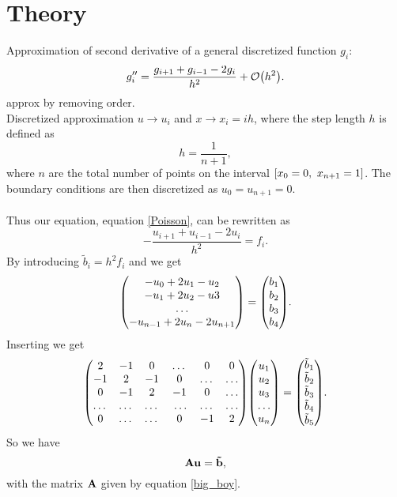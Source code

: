 \documentclass[notitlepage, reprint, nofootinbib]{revtex4-1}
\begin{document}
\section{Theory}
Approximation of second derivative of a general discretized function $g_i$: 
\begin{equation}\label{second_derivative} g_i'' = \frac{g_{i+1}+g_{i-1}-2g_i}{h^2}+\order{h^2}.\end{equation}
{\color{red}approx by removing order.} \\[2mm]
Discretized approximation $u\rightarrow u_i$ and $x\rightarrow x_i=ih$, where the step length $h$ is defined as
\begin{equation}\label{step-length}h=\frac{1}{n+1},\end{equation} 
where $n$ are the total number of points on the interval $\qty[x_0=0,\ x_{n+1}=1]$. The boundary conditions are then discretized as $u_0=u_{n+1}=0$.\\[2mm]
{\color{red}{fiks tekst i utledningen below}}\\[2mm]
Thus our equation, equation \ref{Poisson}, can be rewritten as
$$-\frac{u_{i+1}+u_{i-1}-2u_i}{h^2}=f_i.$$
By introducing $\tilde{b}_i=h^2 f_i$ and {\color{red}{inserting for $i$}} we get
$$\mqty(-u_0+2u_1-u_2 \\ -u_1+2u_2-u3 \\ \dots \\ -u_{n-1}+2u_n-2u_{n+1})=\mqty(b_1\\b_2\\b_3\\b_4).$$
Inserting we get
\begin{equation}\label{big_boy}\mqty( 2 & -1 & 0 & \dots & 0 & 0 \\ -1 & 2 & -1 & 0 &\dots&\dots \\ 0 & -1 & 2 & -1 & 0 & \dots \\ \dots & \dots & \dots & \dots &\dots &\dots \\ 0 & \dots & \dots & 0 & -1 & 2)\mqty(u_1\\u_2\\u_3\\\dots\\u_n)=\mqty(\tilde{b}_1\\ \tilde{b}_2\\ \tilde{b}_3\\ \tilde{b}_4 \\ \tilde{b}_5). \end{equation}
So we have 
\begin{equation}\label{small_boy}\vb{A}\vb{u}=\vb{\tilde{b}},\end{equation}
with the matrix $\vb{A}$ given by equation \ref{big_boy}.
\end{document}
